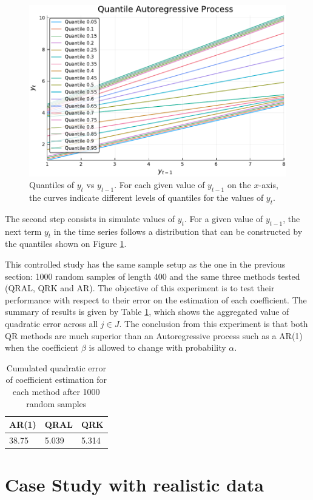 \begin{figure}[h]
	\centering
	\centerline{\includegraphics[width=0.8\linewidth]{Images/Qar.pdf}}
	\caption{Quantiles of $y_t$ vs $y_{t-1}$. For each given value of $y_{t-1}$ on the $x$-axis, the curves indicate different levels of quantiles for the values of $y_t$.}
	\label{fig:qar}
\end{figure}

The second step consists in simulate values of $y_t$. For a given value of $y_{t-1}$, the next term $y_t$ in the time series follows a distribution that can be constructed by the quantiles shown on Figure \ref{fig:qar}. 

This controlled study has the same sample setup as the one in the previous section: 1000 random samples of length 400 and the same three methods tested (QRAL, QRK and AR). The objective of this experiment is to test their performance with respect to their error on the estimation of each coefficient. The summary of results is given by Table \ref{tab:qar-results}, which shows the aggregated value of quadratic error across all $j \in J$.
The conclusion from this experiment is that both QR methods are much superior than an Autoregressive process such as a AR(1) when the coefficient $\beta$ is allowed to change with probability $\alpha$. 


\begin{table}[h]
\centering
\caption{Cumulated quadratic error of coefficient estimation for each method after 1000 random samples}
\label{tab:qar-results}
\begin{tabular}{lll}
\hline
AR(1) & QRAL & QRK   \\ \hline
38.75 & 5.039       & 5.314
\end{tabular}
\end{table}

\section{Case Study with realistic data}


